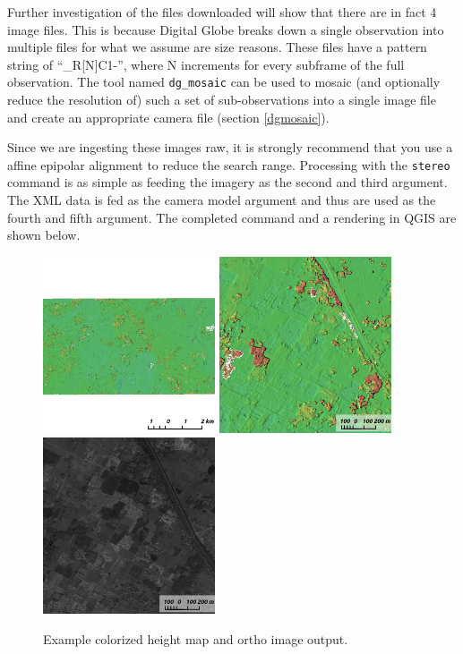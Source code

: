 Further investigation of the files downloaded will show that there are
in fact 4 image files. This is because Digital Globe breaks down a
single observation into multiple files for what we assume are size
reasons. These files have a pattern string of ``\_R[N]C1-'', where N
increments for every subframe of the full observation. The tool named
\texttt{dg\_mosaic} can be used to mosaic (and optionally reduce the
resolution of) such a set of sub-observations into a single image file
and create an appropriate camera file (section \ref{dgmosaic}).

Since we are ingesting these images raw, it is strongly recommend that
you use a affine epipolar alignment to reduce the search range. Processing
with the \texttt{stereo} command is as simple as feeding the imagery
as the second and third argument. The XML data is fed as the camera
model argument and thus are used as the fourth and fifth argument. The
completed command and a rendering in QGIS are shown below.

\begin{figure}[h!]
\centering
  \includegraphics[width=2.0in]{images/examples/dg/DigitalGlobeContext.png}
  \includegraphics[width=2.0in]{images/examples/dg/DigitalGlobeCloseUp.png}
  \includegraphics[width=2.0in]{images/examples/dg/DigitalGlobeCloseUpDRG.png}
\caption{Example colorized height map and ortho image output.}
\label{fig:dg-nomap-example}
\end{figure}

